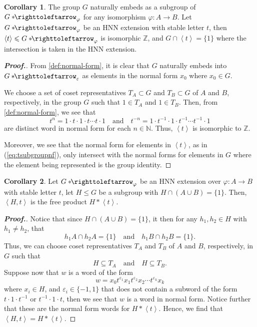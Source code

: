 \documentclass[11pt,a4paper,reqno]{amsart}
\theoremstyle{plain}
\theoremstyle{definition}
\newtheorem{corollary}{Corollary}[theorem]
\theoremstyle{definition}
\renewcommand\leq\leqslant
\newenvironment{myproof}{\begin{proof}[\normalfont\bfseries Proof.]}{\end{proof}}
\newcommand\hnn{*\!\!\righttoleftarrow}
\begin{document}
\begin{corollary}\label{lem:stable-letter-subgroup}
	The group $G$ naturally embeds as a subgroup of $G\hnn_\varphi$ for any isomorphism $\varphi \colon A\to B$.
	Let $G\hnn_\varphi$ be an HNN extension with stable letter $t$, then $\left\langle t\right\rangle\leq G\hnn_\varphi$ is isomorphic $\mathbb Z$, and $G \cap \left\langle t \right\rangle = \{1\}$ where the intersection is taken in the HNN extension.
\end{corollary}
\begin{myproof}
	From \cref{def:normal-form}, it is clear that $G$ naturally embeds into $G\hnn_\varepsilon$ as elements in the normal form $x_0$ where $x_0 \in G$.

	We choose a set of coset representatives $T_A\subset G$ and $T_B\subset G$ of $A$ and $B$, respectively, in the group $G$ such that $1\in T_A$ and $1\in T_B$.
	Then, from \cref{def:normal-form}, we see that
  \begin{equation}\label{eq:tsubgroupnf}
		t^{n} = 1 \cdot t \cdot 1 \cdot t \cdots t \cdot 1
		\quad\text{and}\quad
		t^{-n} = 1 \cdot t^{-1} \cdot 1 \cdot t^{-1} \cdots t^{-1} \cdot 1
  \end{equation}are distinct word in normal form for each $n \in \mathbb N$.
	Thus, $\left\langle t \right\rangle$ is isomorphic to $\mathbb Z$.

  Moreover, we see that the normal form for elements in $\left\langle t \right\rangle$, as in (\ref{eq:tsubgroupnf}), only intersect with the normal forms for elements in $G$ where the element being represented is the group identity.
\end{myproof}

\begin{corollary}\label{lem:free-subgroup}
	Let $G\hnn_\varphi$ be an HNN extension over $\varphi\colon A\to B$ with stable letter $t$,
	let $H \leq G$ be a subgroup with $H\cap (A\cup B)=\{1\}$.
	Then, $\left\langle H,t \right\rangle$ is the free product $H * \left\langle t\right\rangle$.
\end{corollary}
\begin{myproof}
  Notice that since $H \cap (A\cup B) = \{1\}$, it then for any $h_1,h_2 \in H$ with $h_1\neq h_2$, that
	\[
		h_1 A \cap h_2 A = \{1\}
		\quad
		\text{and}
		\quad
		h_1 B \cap h_2 B = \{1\}.
	\]
	Thus, we can choose coset representatives $T_A$ and $T_B$ of $A$ and $B$, respectively, in $G$ such that
	\[
		H \subseteq T_A
		\quad
		\text{and}
		\quad
		H \subseteq T_B.
	\]
	Suppose now that $w$ is a word of the form
	\[
    w=
		x_0 t^{\varepsilon_1} x_1 t^{\varepsilon_2} x_2 \cdots t^{\varepsilon_k} x_k
	\]
  where $x_i\in H$, and $\varepsilon_i\in \{-1,1\}$ that does not contain a subword of the form $t\cdot 1\cdot t^{-1}$ or $t^{-1}\cdot 1\cdot t$, then we see that $w$ is a word in normal form.
	Notice further that these are the normal form words for $H*\left\langle t\right\rangle$.
	Hence, we find that $\left\langle H,t \right\rangle = H*\left\langle t\right\rangle$.
\end{myproof}
\end{document}

